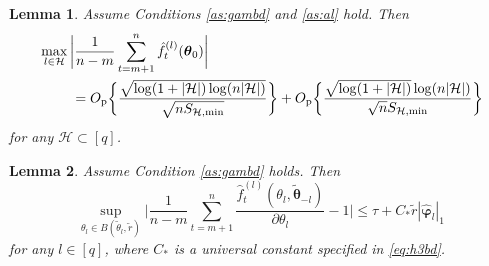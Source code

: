 \documentclass[12pt]{article}
\newtheorem{lemma}{Lemma}
\newcommand{\btheta}{\boldsymbol \theta}
\newcommand{\bvarphi}{\boldsymbol \varphi}
\newcommand{\0}{{\bf 0}}
\begin{document}
\begin{lemma}\label{la:asym2}
Assume Conditions {\rm\ref{as:gambd}} and {\rm\ref{as:al}} hold. Then
\begin{align*}
&\max_{l\in\mathcal{H}}\bigg|\frac{1}{n-m}\sum_{t=m+1}^n\hat{f}_t^{(l)}(\btheta_0)\bigg|\\
&~~~~~~~=O_{\rm p}\bigg\{\frac{\sqrt{\log(1+ |\mathcal{H}|)\log(n|\mathcal{H}|)}}{\sqrt{nS_{\mathcal{H},\min}}}\bigg\}+O_{\rm p}\bigg\{\frac{\sqrt{\log(1+ |\mathcal{H}|)}\log(n|\mathcal{H}|)}{\sqrt{n}S_{\mathcal{H},\min}}\bigg\}
\end{align*}
for any $\mathcal{H}\subset[q]$. 
\end{lemma}

\begin{lemma}\label{la:asym3}
Assume Condition {\rm\ref{as:gambd}} holds. Then
\[
\sup_{\theta_l\in B(\tilde{\theta}_l,\tilde{r})}\bigg|\frac{1}{n-m}\sum_{t=m+1}^n\frac{\hat{f}_t^{(l)}(\theta_l,\tilde{\btheta}_{-l})}{\partial\theta_l}-1\bigg|\leq \tau+C_*\tilde{r}|\hat{\bvarphi}_l|_1
\]
for any $l\in[q]$, where $C_*$ is a universal constant specified in \eqref{eq:h3bd}. 
\end{lemma}
\end{document}
